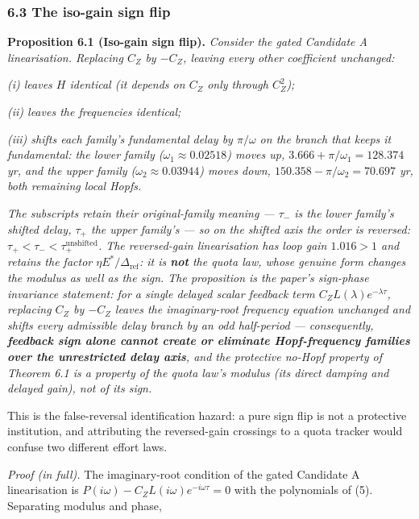 \documentclass[11pt]{article}
\begin{document}
\subsubsection{6.3 The iso-gain sign flip}\label{the-iso-gain-sign-flip}

\textbf{Proposition 6.1 (Iso-gain sign flip).} \emph{Consider the gated
Candidate A linearisation. Replacing \(C_Z\) by \(-C_Z\), leaving every
other coefficient unchanged:}

\emph{(i) leaves \(H\) identical (it depends on \(C_Z\) only through
\(C_Z^2\));}

\emph{(ii) leaves the frequencies identical;}

\emph{(iii) shifts each family's fundamental delay by \(\pi/\omega\) on
the branch that keeps it fundamental: the lower family
(\(\omega_1 \approx 0.02518\)) moves up,
\(3.666 + \pi/\omega_1 = 128.374\) yr, and the upper family
(\(\omega_2 \approx 0.03944\)) moves down,
\(150.358 - \pi/\omega_2 = 70.697\) yr, both remaining local Hopfs.}

\emph{The subscripts retain their original-family meaning --- \(\tau_-\)
is the lower family's shifted delay, \(\tau_+\) the upper family's ---
so on the shifted axis the order is reversed:
\(\tau_+ < \tau_- < \tau_+^{\mathrm{unshifted}}\). The reversed-gain
linearisation has loop gain \(1.016 > 1\) and retains the factor
\(\eta E^*/\Delta_{\mathrm{ref}}\): it is \textbf{not} the quota law,
whose genuine form changes the modulus as well as the sign. The
proposition is the paper's sign-phase invariance statement: for a single
delayed scalar feedback term \(C_Z L(\lambda) e^{-\lambda\tau}\),
replacing \(C_Z\) by \(-C_Z\) leaves the imaginary-root frequency
equation unchanged and shifts every admissible delay branch by an odd
half-period --- consequently, \textbf{feedback sign alone cannot create
or eliminate Hopf-frequency families over the unrestricted delay axis},
and the protective no-Hopf property of Theorem 6.1 is a property of the
quota law's modulus (its direct damping and delayed gain), not of its
sign.}

This is the false-reversal identification hazard: a pure sign flip is
not a protective institution, and attributing the reversed-gain
crossings to a quota tracker would confuse two different effort laws.

\emph{Proof (in full).} The imaginary-root condition of the gated
Candidate A linearisation is
\(P(i\omega) - C_Z L(i\omega) e^{-i\omega\tau} = 0\) with the
polynomials of (5). Separating modulus and phase,
\end{document}
